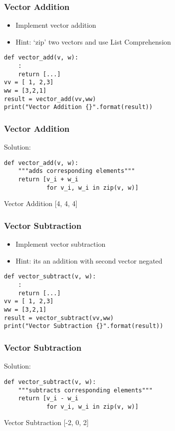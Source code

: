 \begin{frame}[fragile]\frametitle{Vector Addition}
\begin{itemize}
\item Implement vector addition
\item Hint: `zip' two vectors and use List Comprehension
\end{itemize}
\begin{lstlisting}
def vector_add(v, w):
	:
	return [...]
vv = [ 1, 2,3]
ww = [3,2,1]
result = vector_add(vv,ww)
print("Vector Addition {}".format(result))
\end{lstlisting}
\end{frame}


\begin{frame}[fragile]\frametitle{Vector Addition}
Solution:
\begin{lstlisting}
def vector_add(v, w):
    """adds corresponding elements"""
    return [v_i + w_i
            for v_i, w_i in zip(v, w)]
\end{lstlisting}
Vector Addition [4, 4, 4]
\end{frame}

\begin{frame}[fragile]\frametitle{Vector Subtraction}
\begin{itemize}
\item Implement vector subtraction
\item Hint: its an addition with second vector negated
\end{itemize}
\begin{lstlisting}
def vector_subtract(v, w):
	:
	return [...]
vv = [ 1, 2,3]
ww = [3,2,1]
result = vector_subtract(vv,ww)
print("Vector Subtraction {}".format(result))
\end{lstlisting}
\end{frame}

\begin{frame}[fragile]\frametitle{Vector Subtraction}
Solution:
\begin{lstlisting}
def vector_subtract(v, w):
    """subtracts corresponding elements"""
    return [v_i - w_i
            for v_i, w_i in zip(v, w)]
\end{lstlisting}
Vector Subtraction [-2, 0, 2]
\end{frame}


